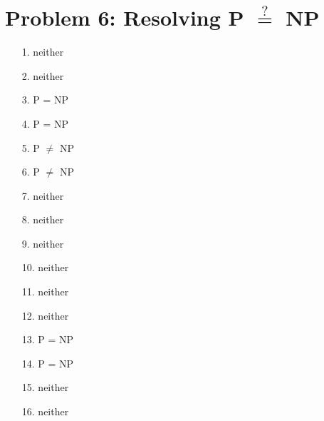 \documentclass[10pt,letter]{article}
\begin{document}
\section*{Problem 6: Resolving P $\stackrel{?}{=}$ NP}

\begin{enumerate}
\item[1.] neither
\item[2.] neither
\item[3.] P = NP
\item[4.] P = NP
\item[5.] P $\neq$ NP
\item[6.] P $\neq$ NP
\item[7.] neither
\item[8.] neither
\item[9.] neither
\item[10.] neither
\item[11.] neither
\item[12.] neither
\item[13.] P = NP
\item[14.] P = NP
\item[15.] neither
\item[16.] neither
\end{enumerate}
\end{document}
